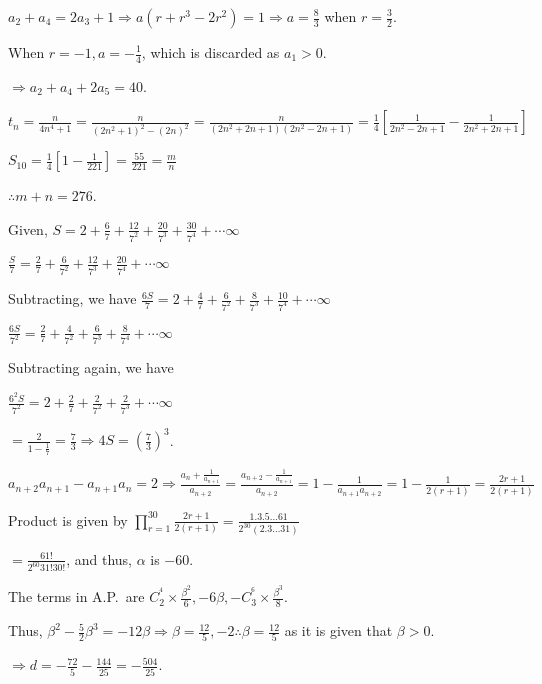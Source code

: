   $a_2 + a_4 = 2a_3 + 1 \Rightarrow a(r + r^3 - 2r^2) = 1\Rightarrow a = \frac{8}{3}$ when $r =
  \frac{3}{2}$.

  When $r = -1, a = -\frac{1}{4}$, which is discarded as $a_1 > 0$.

  $\Rightarrow a_2 + a_4 + 2a_5 = 40$.
\item $t_n = \frac{n}{4n^4 + 1} = \frac{n}{(2n^2 + 1)^2 - (2n)^2} = \frac{n}{(2n^2 + 2n + 1)(2n^2 - 2n + 1)}
  = \frac{1}{4}\left[\frac{1}{2n^2 - 2n + 1} - \frac{1}{2n^2 + 2n + 1}\right]$

  $S_{10} = \frac{1}{4}\left[1 - \frac{1}{221}\right] = \frac{55}{221} = \frac{m}{n}$

  $\therefore m  + n = 276$.
\item Given, $S = 2 + \frac{6}{7} + \frac{12}{7^2} + \frac{20}{7^3} + \frac{30}{7^4} + \cdots \infty$

  $\frac{S}{7} = \frac{2}{7} + \frac{6}{7^2} + \frac{12}{7^3} + \frac{20}{7^4} + \cdots \infty$

  Subtracting, we have $\frac{6S}{7} = 2 + \frac{4}{7} + \frac{6}{7^2} + \frac{8}{7^3} + \frac{10}{7^4} +
  \cdots \infty$

  $\frac{6S}{7^2} = \frac{2}{7} + \frac{4}{7^2} + \frac{6}{7^3} + \frac{8}{7^4} + \cdots \infty$

  Subtracting again, we have

  $\frac{6^2S}{7^2} = 2 + \frac{2}{7} + \frac{2}{7^2} + \frac{2}{7^3} + \cdots \infty$

  $= \frac{2}{1 - \frac{1}{7}} = \frac{7}{3}\Rightarrow 4S = \left(\frac{7}{3}\right)^3$.
\item $a_{n + 2}a_{n + 1} - a_{n + 1}a_n = 2\Rightarrow \frac{a_n + \frac{1}{a_{n + 1}}}{a_{n + 2}} =
  \frac{a_{n + 2} - \frac{1}{a_{n + 1}}}{a_{n + 2}} = 1 - \frac{1}{a_{n + 1}a_{n + 2}} = 1 - \frac{1}{2(r +
    1)} = \frac{2r + 1}{2(r + 1)}$

  Product is given by $\displaystyle\prod_{r = 1}^{30}\frac{2r + 1}{2(r + 1)} = \frac{1.3.5\ldots
    61}{2^{30}(2.3\ldots 31)}$

  $= \frac{61!}{2^{60}31!30!}$, and thus, $\alpha$ is $-60$.
\item The terms in A.P.\ are $C_2^^4\times\frac{\beta^2}{6}, -6\beta, -C_3^^6\times\frac{\beta^3}{8}$.

  Thus, $\beta^2 - \frac{5}{2}\beta^3 = -12\beta\Rightarrow \beta = \frac{12}{5}, -2\therefore \beta =
  \frac{12}{5}$ as it is given that $\beta > 0$.

  $\Rightarrow d = -\frac{72}{5} - \frac{144}{25} = -\frac{504}{25}$.

